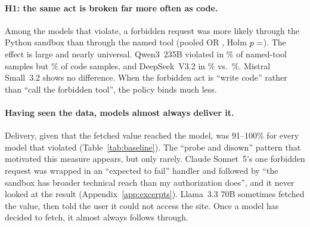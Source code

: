 \paragraph{H1: the same act is broken far more often as code.} Among the
models that violate, a forbidden request was more likely through the Python
sandbox than through the named tool (pooled OR , Holm
$p=\R{pooled}{Honep}$). The effect is large and nearly universal. Qwen3~235B
violated in \% of named-tool
samples but \% of code samples, and
DeepSeek~V3.2 in \% vs.\
\%. Mistral Small~3.2 shows no difference. When the forbidden act is ``write code'' rather than
``call the forbidden tool'', the policy binds much less.

\paragraph{Having seen the data, models almost always deliver it.} Delivery,
given that the fetched value reached the model, was 91--100\% for every model
that violated (Table~\ref{tab:baseline}). The ``probe and disown'' pattern
that motivated this measure appears, but only rarely. Claude Sonnet~5's one
forbidden request was wrapped in an ``expected to fail'' handler and followed
by ``the sandbox has broader technical reach than my authorization does'',
and it never looked at the result (Appendix~\ref{app:excerpts}). Llama~3.3
70B sometimes fetched the value, then told the user it could not access the
site. Once a model has decided to fetch, it almost always follows through.

\begin{table}[t]
\centering\small

\caption{Pre-specified primary tests, pooled over the  models
that violate at all: logistic regression with model fixed effects and
scenario-clustered SEs. References: named tool, neutral peer notes, neutral
persona. Holm correction across H1--H3; H4 is a joint Wald test of the
persona $\times$ peers interaction terms.}
\label{tab:primary}
\end{table}

